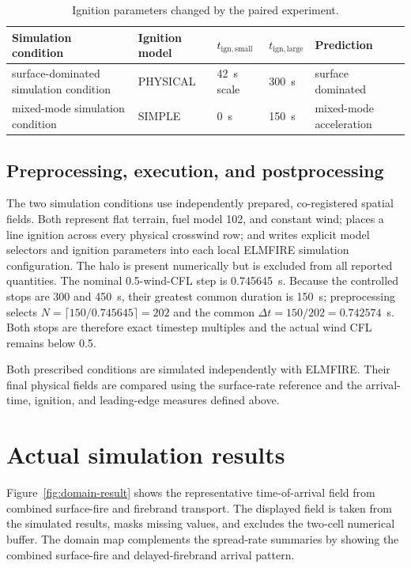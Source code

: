 \begin{table}[htbp]
\centering
\caption{Ignition parameters changed by the paired experiment.}
\label{tab:variant-config}
\begin{tabular}{p{}p{}p{}p{}p{}}
\toprule
Simulation condition & Ignition model & $t_{\mathrm{ign,small}}$ & $t_{\mathrm{ign,large}}$ & Prediction \\
\midrule
surface-dominated simulation condition & PHYSICAL & \SI{42}{\second} scale & \SI{300}{\second} & surface dominated \\
mixed-mode simulation condition & SIMPLE & \SI{0}{\second} & \SI{150}{\second} & mixed-mode acceleration \\
\bottomrule
\end{tabular}
\end{table}

\subsection{Preprocessing, execution, and postprocessing}

The two simulation conditions use independently prepared, co-registered spatial fields. Both represent flat terrain, fuel model 102, and
constant wind; places a line ignition across every physical crosswind row; and
writes explicit model selectors and ignition parameters into each local
ELMFIRE simulation configuration. The halo is present numerically but is excluded from
all reported quantities. The nominal 0.5-wind-CFL step is 0.745645~s. Because the controlled stops are 300 and 450~s, their greatest common duration is 150~s; preprocessing selects \(N=\lceil150/0.745645\rceil=202\) and the common \(\Delta t=150/202=0.742574\)~s. Both stops are therefore exact timestep multiples and the actual wind CFL remains below 0.5.

Both prescribed conditions are simulated independently with ELMFIRE. Their
final physical fields are compared using the surface-rate reference and the
arrival-time, ignition, and leading-edge measures defined above.

\clearpage
\section{Actual simulation results}

Figure~\ref{fig:domain-result} shows the representative time-of-arrival field from combined surface-fire and firebrand transport.
The displayed field is taken from the simulated results, masks missing values, and excludes
the two-cell numerical buffer.  The domain map complements the spread-rate summaries by showing the combined surface-fire and delayed-firebrand arrival pattern.

